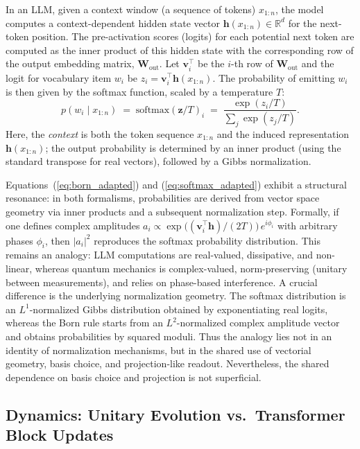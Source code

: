 \documentclass[%
  reprint,
  superscriptaddress,
  showpacs,
  showkeys,
  amsmath,amssymb,
  pra,
  longbibliography,
  floatfix,
  x11names
]{revtex4-2}
\begin{document}
In an LLM, given a context window (a sequence of tokens) $x_{1:n}$, the model computes a context-dependent hidden state vector $\bm{h}(x_{1:n}) \in \mathbb{R}^{d}$ for the next-token position. The pre-activation scores (logits) for each potential next token are computed as the inner product of this hidden state with the corresponding row of the output embedding matrix, $\bm{W}_{\text{out}}$. Let $\bm{v}_i^\intercal$ be the $i$-th row of $\bm{W}_{\text{out}}$ and the logit for vocabulary item $w_i$ be $z_i = \bm{v}_i^\intercal \bm{h}(x_{1:n})$. The probability of emitting $w_i$ is then given by the softmax function, scaled by a temperature $T$:
\begin{equation}
    p(w_i \mid x_{1:n}) \;=\; \mathrm{softmax}(\bm{z}/T)_i \;=\; \frac{\exp(z_i/T)}{\sum_{j} \exp(z_j/T)}.
    \label{eq:softmax_adapted}
\end{equation}
Here, the \emph{context} is both the token sequence $x_{1:n}$ and the induced representation $\bm{h}(x_{1:n})$; the output probability is determined by an inner product (using the standard transpose for real vectors), followed by a Gibbs normalization.

Equations~(\ref{eq:born_adapted}) and (\ref{eq:softmax_adapted}) exhibit a structural resonance: in both formalisms, probabilities are derived from vector space geometry via inner products and a subsequent normalization step. Formally, if one defines complex amplitudes $a_i \propto \exp\bigl((\bm{v}_i^\intercal \bm{h})/(2T)\bigr)\,e^{i\phi_i}$ with arbitrary phases $\phi_i$, then $|a_i|^{2}$ reproduces the softmax probability distribution. This remains an analogy: LLM computations are real-valued, dissipative, and non-linear, whereas quantum mechanics is complex-valued, norm-preserving (unitary between measurements), and relies on phase-based interference.
A crucial difference is the underlying normalization geometry.
The softmax distribution is an $L^1$-normalized Gibbs distribution obtained by exponentiating real logits, whereas the Born rule starts from an $L^2$-normalized complex amplitude vector and obtains probabilities by squared moduli.
Thus the analogy lies not in an identity of normalization mechanisms, but in the shared use of vectorial geometry, basis choice, and projection-like readout.
Nevertheless, the shared dependence on basis choice and projection is not superficial.

\subsection{Dynamics: Unitary Evolution vs.\ Transformer Block Updates}
\end{document}
